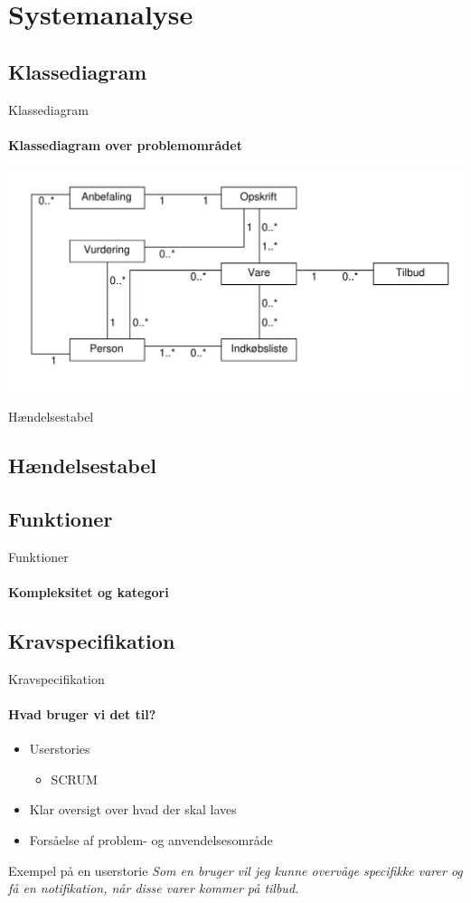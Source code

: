 \section{Systemanalyse}
\subsection{Klassediagram}
\begin{frame}{Klassediagram}
	\framesubtitle{Klassediagram over problemområdet}
	\includegraphics[width=1\textwidth]{images/klassediagram_model_simple.pdf}
\end{frame}
\begin{frame}{Hændelsestabel}
\subsection{Hændelsestabel}
	\framesubtitle{}
	
\end{frame}
\subsection{Funktioner}
\begin{frame}{Funktioner}
	\framesubtitle{Kompleksitet og kategori}
	
\end{frame}

\subsection{Kravspecifikation}
\begin{frame}{Kravspecifikation}
	\framesubtitle{Hvad bruger vi det til?}
	\begin{itemize} 
    	\item Userstories
    	\begin{itemize}
    		\item SCRUM
    	\end{itemize}
    	\item Klar oversigt over hvad der skal laves
    	\item Forsåelse af problem- og anvendelsesområde
  	\end{itemize}
    \begin{beamerboxesrounded}[upper=headerCol,lower=bodyCol,shadow=true]{Exempel på en userstorie}
    \textit{Som en bruger vil jeg kunne overvåge specifikke varer og få en notifikation, når disse
varer kommer på tilbud.}
    \end{beamerboxesrounded}
\end{frame}

